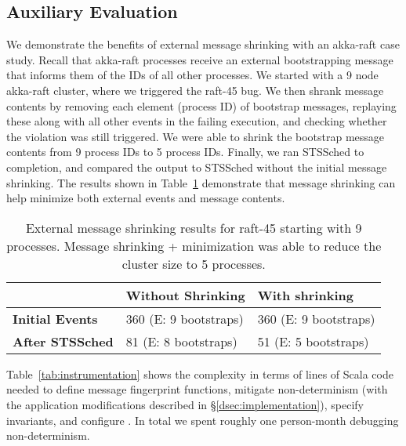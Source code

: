 \subsection{Auxiliary Evaluation}

 We demonstrate the benefits of
external message shrinking with an akka-raft case study. Recall that akka-raft
processes receive an external bootstrapping message that informs
them of the IDs of all other processes. We started with a 9 node akka-raft
cluster, where we triggered the raft-45 bug.
We then shrank message contents by removing each element (process ID) of bootstrap messages,
replaying these along with all other events in the failing execution, and
checking whether the violation was still triggered. We were able to shrink the
bootstrap message contents from 9 process IDs to 5 process IDs. Finally, we
ran STSSched to completion, and compared the output to STSSched without the
initial message shrinking. The results shown in
Table~\ref{tab:message_shrinking} demonstrate that message shrinking can help
minimize both external events and message contents.

\begin{table}
\centering
\begin{tabular}{|l|l|l|}
  \cline{2-3}
  \multicolumn{1}{c|}{~} & \textbf{Without Shrinking} & \textbf{With
  shrinking} \\\cline{2-3} \hline
{\textbf{Initial Events}} & 360 \hfill (E: 9 bootstraps) & 360 \hfill (E: 9 bootstraps) \\
\hline
{\textbf{After STSSched}} & 81 \hfill (E: 8 bootstraps) & 51 \hfill (E: 5 bootstraps) \\
\hline
\end{tabular}
\caption{External message shrinking results for raft-45 starting with 9
processes. Message shrinking + minimization was able to reduce the cluster
size to 5 processes.}
\label{tab:message_shrinking}
\end{table}

 Table~\ref{tab:instrumentation} shows
the complexity in terms of lines of Scala code needed to define message fingerprint
functions, mitigate non-determinism (with the application modifications
described in \S\ref{dsec:implementation}), specify invariants, and configure
\sys. In total we spent roughly one person-month debugging
non-determinism.

